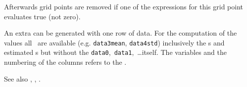 Afterwards grid points are removed if one of the  expressions
for this grid point evaluates true (not zero).

An extra  can be generated with one row of data.
For the computation of the  values
all~ are available
(e.g. \verb|data3mean|, \verb|data4std|) inclusively the s and
estimated s but without the \verb|data0|,~\verb|data1|,~\ldots itself.
The variables and the numbering of the columns refers to the .

See also , , .


\keepXColumns
